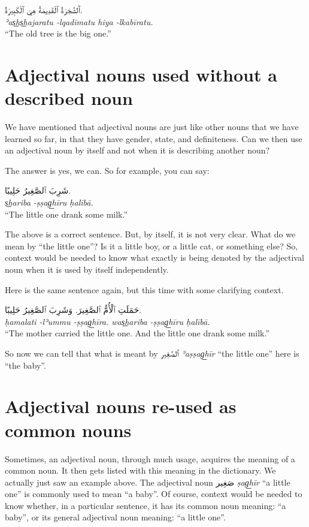 \documentclass[
  10pt,
]{book}
\begin{document}
\foreignlanguage{arabic}{ٱَلشَّجَرَةُ ٱلْقَدِيمَةُ هِيَ ٱلْکَبِيرَةُ.}\\
\emph{ʾas͟hs͟hajaratu -lqadīmatu hiya -lkabīratu.}\\
\enquote{The old tree is the big one.}

\section{Adjectival nouns used without a described noun}\label{adjectival-nouns-used-without-a-described-noun}

We have mentioned that adjectival nouns are just like other nouns that we have learned so far, in that they have gender, state, and definiteness. Can we then use
an adjectival noun by itself and not when it is describing another noun?

The answer is yes, we can. So for example, you can say:

\foreignlanguage{arabic}{شَرِبَ ٱلصَّغِيرُ حَلِيبًا.}\\
\emph{s͟hariba -ṣṣag͟hīru ḥalībā.}\\
\enquote{The little one drank some milk.}

The above is a correct sentence. But, by itself, it is not very clear. What do we mean by \enquote{the little one}? Is it a little boy, or a little cat, or something else? So, context would be needed to know what exactly is being denoted by the adjectival noun when it is used by itself independently.

Here is the same sentence again, but this time with some clarifying context.

\foreignlanguage{arabic}{حَمَلَتِ ٱلْأُمُّ ٱلصَّغِيرَ. وَشَرِبَ ٱلصَّغِيرُ حَلِيبًا.}\\
\emph{ḥamalati -lʾummu -ṣṣag͟hīra. was͟hariba -ṣṣag͟hīru ḥalībā.}\\
\enquote{The mother carried the little one. And the little one drank some milk.}

So now we can tell that what is meant by \foreignlanguage{arabic}{ٱلصَّغِير} \emph{ʾaṣṣag͟hīr} \enquote{the little one} here is \enquote{the baby}.

\section{Adjectival nouns re-used as common nouns}\label{adjectival-nouns-re-used-as-common-nouns}

Sometimes, an adjectival noun, through much usage, acquires the meaning of a common noun. It then gets listed with this meaning in the dictionary. We actually just saw an example above. The adjectival noun
\foreignlanguage{arabic}{صَغِير} \emph{ṣag͟hīr} \enquote{a little one} is commonly used to mean \enquote{a baby}. Of course, context would be needed to know whether, in a particular sentence, it has its common noun meaning: \enquote{a baby}, or its general adjectival noun meaning: \enquote{a little one}.
\end{document}
